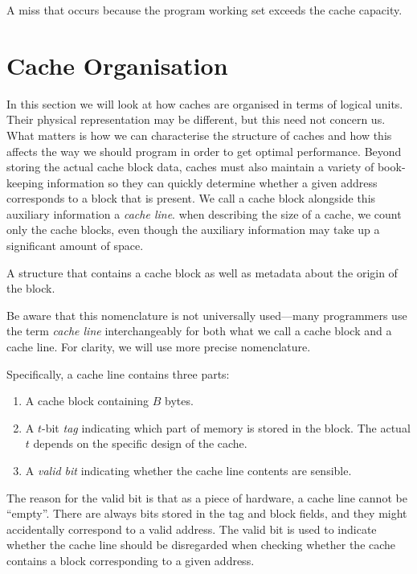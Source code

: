 \begin{definition}
  A miss that occurs because the program working set exceeds the cache
  capacity.
\end{definition}

\section{Cache Organisation}
\label{sec:cache-organisation}

In this section we will look at how caches are organised in terms of
logical units.  Their physical representation may be different, but
this need not concern us.  What matters is how we can characterise the
structure of caches and how this affects the way we should program in
order to get optimal performance.  Beyond storing the actual cache
block data, caches must also maintain a variety of book-keeping
information so they can quickly determine whether a given address
corresponds to a block that is present.  We call a cache block
alongside this auxiliary information a \emph{cache line}.  when
describing the size of a cache, we count only the cache blocks, even
though the auxiliary information may take up a significant amount of
space.

\begin{definition}
  A structure that contains a cache block as well as metadata about
  the origin of the block.
\end{definition}

Be aware that this nomenclature is not universally used---many
programmers use the term \emph{cache line} interchangeably for both
what we call a cache block and a cache line.  For clarity, we will use
more precise nomenclature.

Specifically, a cache line contains three parts:

\begin{enumerate}
\item A cache block containing $B$ bytes.
\item A $t$-bit \emph{tag} indicating which part of memory is stored
  in the block.  The actual $t$ depends on the specific design of the
  cache.
\item A \emph{valid bit} indicating whether the cache line contents
  are sensible.
\end{enumerate}

The reason for the valid bit is that as a piece of hardware, a cache
line cannot be ``empty''.  There are always bits stored in the tag and
block fields, and they might accidentally correspond to a valid
address.  The valid bit is used to indicate whether the cache line
should be disregarded when checking whether the cache contains a block
corresponding to a given address.

